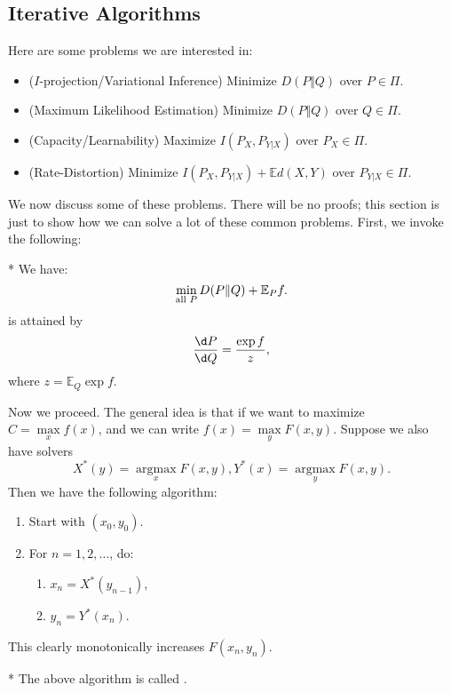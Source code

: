 \subsection{Iterative Algorithms}

\begin{que}
	Here are some problems we are interested in:
	\begin{itemize}
		\item ($I$-projection/Variational Inference) Minimize $D(P\Vert Q)$ over $P\in \Pi$.
		\item (Maximum Likelihood Estimation) Minimize $D(P\Vert Q)$ over $Q\in \Pi$.
		\item (Capacity/Learnability) Maximize $I(P_X, P_{Y|X})$ over $P_X\in \Pi$.
		\item (Rate-Distortion) Minimize $I(P_X,P_{Y|X}) + \mathbb E d(X,Y)$ over $P_{Y|X}\in \Pi$.
	\end{itemize}
\end{que}

We now discuss some of these problems. There will be no proofs; this section is just to show how we can solve a lot of these common problems. 
First, we invoke the following:

\begin{fact}*
	We have: \[
		\min_{\textnormal{all }P} D(P\Vert Q) + \mathbb E_P f.
	\]
	is attained by \[
		\frac{\d P}{\d Q} = \frac{\exp f}{z},
	\]
	where $z = \mathbb E_Q \exp f$.
\end{fact}

Now we proceed. The general idea is that if we want to maximize $C = \max\limits_x f(x)$, and we can write $f(x) = \max\limits_y F(x,y)$.  
Suppose we also have solvers \[
	X^*(y) = \operatorname{argmax}\limits_x F(x,y), Y^*(x) = \operatorname{argmax}\limits_y F(x,y).
\]
Then we have the following algorithm:

\begin{enumerate}
	\item Start with $(x_0, y_0)$.
	\item For $n = 1, 2, \ldots$, do:
		\begin{enumerate}
			\item $x_n = X^*(y_{n-1})$,
			\item $y_n = Y^*(x_n)$.
		\end{enumerate}
\end{enumerate}

This clearly monotonically increases $F(x_n, y_n)$.

\begin{defn}*
	The above algorithm is called .
\end{defn}

